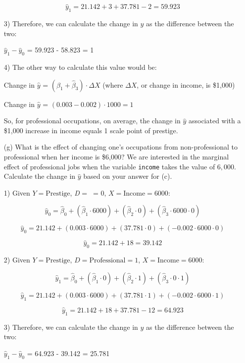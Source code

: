 \documentclass[12pt,letterpaper]{article}
\begin{document}
\begin{enumerate}
\[ \hat{\textit{y}}_1 = 21.142 + 3 + 37.781 - 2 = 59.923 \] 


3) Therefore, we can calculate the change in $\hat{\textit{y}}$ as the difference between the two:

\textbf{$\hat{y}_1 - \hat{y}_0$ }= 59.923 - 58.823 = 1

4) The other way to calculate this value would be:

Change in \textbf{$\hat{y}$} = $(\hat{\beta}_1 + \hat{\beta}_3) \cdot \Delta X$ (where $\Delta X$, or change in income, is \$1,000)

Change in \textbf{$\hat{y}$} = $(0.003 - 0.002) \cdot 1000 = 1$

So, for professional occupations, on average, the change in $\hat{\textit{y}}$ associated with a \$1,000 increase in income equals 1 scale point of prestige.
	
	\item [(g)]
	What is the effect of changing one's occupations from non-professional to professional when her income is \$6,000? We are interested in the marginal effect of professional jobs when the variable \texttt{income} takes the value of $6,000$. Calculate the change in $\hat{y}$ based on your answer for (c).


1) Given \(Y = \text{Prestige}\), \textit{D} = \ = 0, \(X = \text{Income} = 6000\):

\[ \hat{\textit{y}}_0 = \hat{\beta}_0 + (\hat{\beta}_1 \cdot 6000) + (\hat{\beta}_2 \cdot 0) + (\hat{\beta}_3 \cdot 6000 \cdot 0)  \] 

\[ \hat{\textit{y}}_0 = 21.142  + (0.003 \cdot 6000) + (37.781 \cdot 0) + (-0.002 \cdot 6000 \cdot 0)  \] 

\[ \hat{\textit{y}}_0 = 21.142 + 18 = 39.142 \] 

2) Given \(Y = \text{Prestige}\), \(D = \text{Professional} = 1\), \(X = \text{Income} = 6000\):

\[ \hat{\textit{y}}_1 = \hat{\beta}_0 + (\hat{\beta}_1 \cdot 0) + (\hat{\beta}_2 \cdot 1) + (\hat{\beta}_3 \cdot 0 \cdot 1)  \] 

\[ \hat{\textit{y}}_1 = 21.142  + (0.003 \cdot 6000) + (37.781 \cdot 1) + (-0.002 \cdot 6000 \cdot 1)  \] 

\[ \hat{\textit{y}}_1 = 21.142 + 18 + 37.781 - 12 = 64.923 \] 

3) Therefore, we can calculate the change in $\hat{\textit{y}}$ as the difference between the two:

\textbf{$\hat{y}_1 - \hat{y}_0$ }= 64.923 - 39.142 = 25.781


\end{enumerate}
\end{document}
